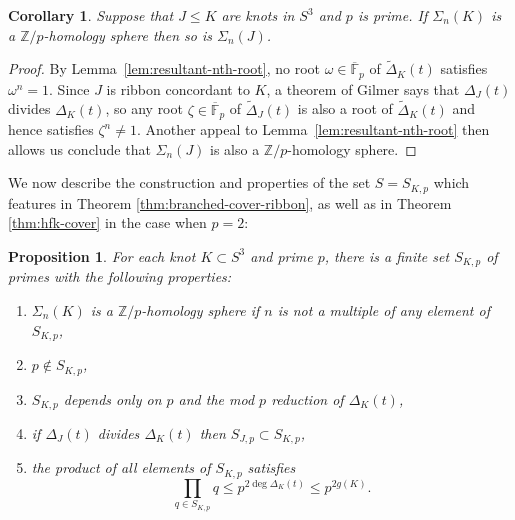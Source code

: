 \documentclass[11pt]{amsart}
\newtheorem {proposition}[theorem]{Proposition}
\newtheorem {corollary}[theorem]{Corollary}
\numberwithin{equation}{section}
\numberwithin{theorem}{section}
\theoremstyle{definition}
\newcommand{\Z}{\mathbb{Z}}
\newcommand{\F}{\mathbb{F}}
\begin{document}
\begin{corollary} \label{cor:ribbon-outgoing-homology-sphere}
Suppose that $J\leq K$ are knots in $S^3$ and  $p$ is prime. If $\Sigma_n(K)$ is a $\Z/p$-homology sphere then so is $\Sigma_n(J)$.
\end{corollary}

\begin{proof}
By Lemma~\ref{lem:resultant-nth-root}, no root $\omega \in \overline{\F}_p$ of $\tilde\Delta_K(t)$ satisfies $\omega^n = 1$.  Since $J$ is ribbon concordant to $K$, a theorem of Gilmer \cite{gilmer} says that $\Delta_J(t)$ divides $\Delta_K(t)$, so any root $\zeta \in \overline{\F}_p$ of $\tilde\Delta_J(t)$ is also a root of $\tilde\Delta_K(t)$ and hence satisfies $\zeta^n \neq 1$.  Another appeal to Lemma~\ref{lem:resultant-nth-root} then allows us conclude that $\Sigma_n(J)$ is also a $\Z/p$-homology sphere.
\end{proof}

We  now describe the construction and properties of the set $S=S_{K,p}$ which  features in Theorem \ref{thm:branched-cover-ribbon}, as well as in Theorem \ref{thm:hfk-cover} in the case when $p=2$:

\begin{proposition} \label{prop:resultants}
For each knot $K \subset S^3$ and prime $p$, there is a finite set $S_{K,p}$ of primes with the following properties:
\begin{enumerate}
\item $\Sigma_n(K)$ is a $\Z/p$-homology sphere if $n$ is not a multiple of any element of $ S_{K,p}$,  \label{i:SKp-branched-cover}
\item $p \not\in S_{K,p}$, \label{i:p-not-in-SKp}
\item $S_{K,p}$ depends only on $p$ and the mod $p$ reduction of $\Delta_K(t)$, \label{i:SKp-depends-on-Delta}
\item if $\Delta_J(t)$ divides $\Delta_K(t)$ then $S_{J,p} \subset S_{K,p}$, \label{i:SKp-divisibility}
\item the product of all elements of $S_{K,p}$ satisfies \label{i:SKp-product}
\[ \prod_{q\in S_{K,p}} q \leq p^{2\deg \Delta_K(t)} \leq p^{2g(K)}. \]
\end{enumerate}
\end{proposition}
\end{document}
